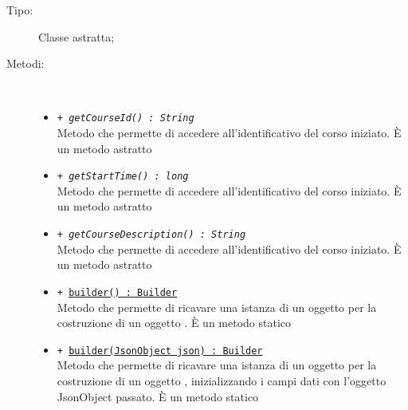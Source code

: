 \documentclass[../Tesi.tex]{subfiles}
\begin{document}
		\begin{description}
			\item[Tipo:] Classe astratta;
			
			\item[Metodi:] \
			\begin{itemize}
				\item \texttt{+ \textit{getCourseId() : String}}\\
				Metodo che permette di accedere all'identificativo del corso iniziato. È un metodo astratto

				\item \texttt{+ \textit{getStartTime() : long}}\\
				Metodo che permette di accedere all'identificativo del corso iniziato. È un metodo astratto

				\item \texttt{+ \textit{getCourseDescription() : String}}\\
				Metodo che permette di accedere all'identificativo del corso iniziato. È un metodo astratto

				\item \texttt{+ \underline{builder() : Builder}}\\
				Metodo che permette di ricavare una istanza di un oggetto  per la costruzione di un oggetto . È un metodo statico

				\item \texttt{+ \underline{builder(JsonObject json) : Builder}}\\
				Metodo che permette di ricavare una istanza di un oggetto  per la costruzione di un oggetto , inizializzando i campi dati con l'oggetto JsonObject passato. È un metodo statico

			\end{itemize}
		\end{description}
\end{document}
